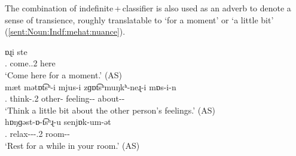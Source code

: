 The combination of indefinite\,+\,classifier is also used as an adverb to denote a sense of transience, roughly translatable to `for a moment' or `a little bit' (\ref{sent:Noun:Indf:mehat:nuance}).

\begin{exe}
	\ex \label{sent:Noun:Indf:mehat:nuance}
	\begin{xlist}
		
		\ex {} {ɒɻi} {ste}
		\\
		{\indf}.{\cl} come.{\imp}.2{\sg} here
		\\
		\trans			`Come here for a moment.' \hfill (AS)
		\\
		\ex \gll mæt  {mətɒt͡sʰ-i} {mjus-i} {zɡɒt͡sʰmuŋkʰ-neɻ-i} {mɒs-i-n}
		\\
		{\indf}.{\cl} think-{\imp}.2{\sg} other-{\gen} feeling-{\pl}-{\gen} about-{\gen}-{}
		\\
		\trans			`Think a little bit about the other person’s feelings.' \hfill (AS)
		\\
		\ex {} {hɒŋɡəst-ɒ-t͡sʰɻ-u} {senjɒk-um-ət}
		\\
		{\indf}.{\cl} relax-{\lvgloss}-{\caus}-{\imp}.2{\sg} room-{\locgloss}-{\possSsg} 
		\\
		\trans	`Rest for a while in your room.' \hfill (AS)
		\\
		
	\end{xlist}
	
\end{exe}
